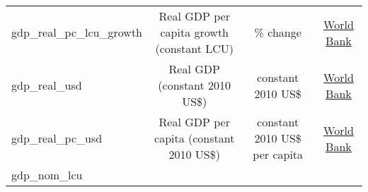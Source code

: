 \documentclass[]{article}
\begin{document}
\begin{longtable}[]{@{}lccc@{}}
\begin{minipage}[t]{0.14\columnwidth}\raggedright\strut
gdp\_real\_pc\_lcu\_growth\strut
\end{minipage} & \begin{minipage}[t]{0.36\columnwidth}\centering\strut
Real GDP per capita growth (constant LCU)\strut
\end{minipage} & \begin{minipage}[t]{0.24\columnwidth}\centering\strut
\% change\strut
\end{minipage} & \begin{minipage}[t]{0.15\columnwidth}\centering\strut
\href{https://data.worldbank.org/indicator/NY.GDP.MKTP.KD}{World
Bank}\strut
\end{minipage}\tabularnewline
\begin{minipage}[t]{0.14\columnwidth}\raggedright\strut
gdp\_real\_usd\strut
\end{minipage} & \begin{minipage}[t]{0.36\columnwidth}\centering\strut
Real GDP (constant 2010 US\$)\strut
\end{minipage} & \begin{minipage}[t]{0.24\columnwidth}\centering\strut
constant 2010 US\$\strut
\end{minipage} & \begin{minipage}[t]{0.15\columnwidth}\centering\strut
\href{https://data.worldbank.org/indicator/NY.GDP.PCAP.KD}{World
Bank}\strut
\end{minipage}\tabularnewline
\begin{minipage}[t]{0.14\columnwidth}\raggedright\strut
gdp\_real\_pc\_usd\strut
\end{minipage} & \begin{minipage}[t]{0.36\columnwidth}\centering\strut
Real GDP per capita (constant 2010 US\$)\strut
\end{minipage} & \begin{minipage}[t]{0.24\columnwidth}\centering\strut
constant 2010 US\$ per capita\strut
\end{minipage} & \begin{minipage}[t]{0.15\columnwidth}\centering\strut
\href{https://data.worldbank.org/indicator/NY.GDP.MKTP.CN}{World
Bank}\strut
\end{minipage}\tabularnewline
\begin{minipage}[t]{0.14\columnwidth}\raggedright\strut
gdp\_nom\_lcu\strut
\end{minipage} & \begin{minipage}[t]{0.36\columnwidth}\centering\strut

\end{minipage}
\end{longtable}
\end{document}
